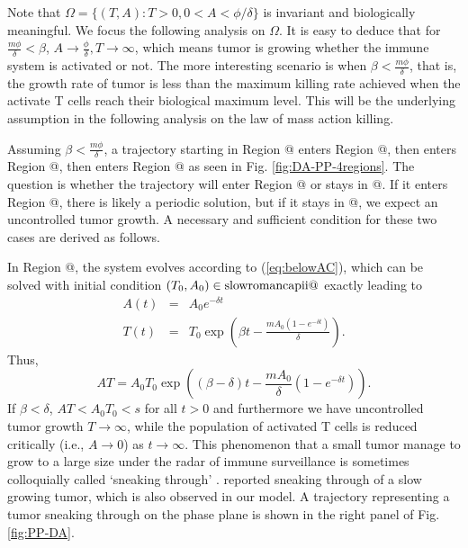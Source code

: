 \documentclass[review,authoryear]{elsarticle}
\makeatletter
\newcommand*{\rom}[1]{\expandafter\@slowromancap\romannumeral #1@}
\makeatother
\begin{document}
Note that $\Omega=\{(T,A):T>0,0<A<\phi/\delta\}$ is invariant and biologically
meaningful. We focus the following analysis on $\Omega$. It is easy to deduce that
for $\frac{m\phi}{\delta}<\beta$, $A\to\frac{\phi}{\delta},T\to\infty$,
which means tumor is growing whether the immune system is activated
or not. The more interesting scenario is when $\beta<\frac{m\phi}{\delta}$,
that is, the growth rate of tumor is less than the maximum killing
rate achieved when the activate T cells reach their biological maximum
level. This will be the underlying assumption in the following analysis on the law of mass action killing. 

Assuming $\beta<\frac{m\phi}{\delta}$, a trajectory starting in Region \rom{3}
enters Region \rom{4}, then enters Region \rom{1}, then enters Region \rom{2} as seen in Fig. \ref{fig:DA-PP-4regions}.
The question is whether the trajectory will enter Region \rom{3} or stays in \rom{2}. If it enters Region \rom{3},
there is likely a periodic solution, but if it stays in \rom{2}, we expect an uncontrolled tumor growth. A necessary and sufficient condition for these two cases are derived as follows.

In Region \rom{2}, the system evolves according to (\ref{eq:belowAC}), which
can be solved with initial condition $(T_{0},A_{0})\in\text{\rom{2}}$
exactly leading to 
\begin{eqnarray}
A(t) & = & A_{0}e^{-\delta t}\nonumber \\
T(t) & = & T_{0}\exp(\beta t-\frac{mA_{0}(1-e^{-\delta t})}{\delta})\label{eq:soln belowAC}.
\end{eqnarray}
Thus,
\begin{equation}
AT=A_{0}T_{0}\exp((\beta-\delta)t-\frac{mA_{0}}{\delta}(1-e^{-\delta t})).
\end{equation} 
If $\beta<\delta$, $AT<A_{0}T_{0}<s$ for all $t>0$ and furthermore
we have uncontrolled tumor growth $T\to\infty$, while the population of activated T cells is reduced critically (i.e., $A\to0$) as $t\to\infty$. This phenomenon that a small tumor manage to grow to a large size under the radar of immune surveillance is sometimes colloquially called `sneaking through' \citep{KUZNETSOV1994}.  \cite{George2018} reported sneaking through of a slow growing tumor, which is also observed in our
model. A trajectory representing a tumor sneaking through on the phase
plane is shown in the right panel of Fig. \ref{fig:PP-DA}. 
\end{document}

